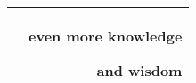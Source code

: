 \documentclass{article}
\newenvironment{displaySourceCode}[1][]
{
    \begin{center}
        \begin{tabular}{l|r}
        \hline
         &
}
{
        and wisdom\\
        \hline
        \end{tabular}
    \end{center}
}
\begin{document}
\begin{displaySourceCode}[knowledge]
    even more knowledge
\end{displaySourceCode}
\end{document}

